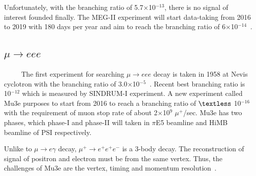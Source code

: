 Unfortunately, with the branching ratio of 5.7$\times$10$^{-13}$, there is no signal of interest founded finally.
The MEG-II experiment will start data-taking from 2016 to 2019 with 180 days per year and aim to reach the branching ratio of 6$\times$10$^{-14}$~\cite{megtdr}.

\subsection{$\mu \rightarrow eee$}
~~~~~The first experiment for searching $\mu \rightarrow eee$ decay is taken in 1958 at Nevis cyclotron with the branching ratio of 3.0$\times$10$^{-5}$~\cite{lyn}.
Recent best branching ratio is 10$^{-12}$ which is measured by SINDRUM-I experiment.
A new experiment called Mu3e purposes to start from 2016 to reach a branching ratio of $\textless$ 10$^{-16}$ with the requirement of muon stop rate of about 2$\times$10$^9$ $\mu^+$/sec.
Mu3e has two phases, which phase-I and phase-II will taken in $\pi$E5 beamline and HiMB beamline of PSI respectively.

Unlike to $\mu \rightarrow e\gamma$ decay, $\mu^+ \rightarrow e^+e^+e^-$ is a 3-body decay.
The reconstruction of signal of positron and electron must be from the same vertex.
Thus, the challenges of Mu3e are the vertex, timing and momentum resolution~\cite{mu3e}.

